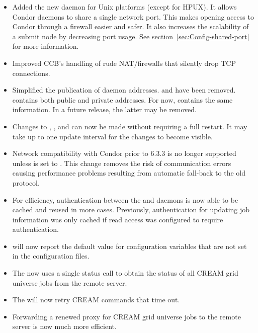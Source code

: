 \begin{itemize}

\item Added the new daemon  for Unix platforms 
  (except for HPUX).
  It allows Condor daemons to share a
  single network port.  This makes opening access to Condor through a
  firewall easier and safer.  It also increases the scalability of a
  submit node by decreasing port usage. See
  section~\ref{sec:Config-shared-port} for more information.

\item Improved CCB's handling of rude NAT/firewalls that silently drop
TCP connections.

\item Simplified the publication of daemon addresses.
   and  have been removed.
   contains both public and private addresses.  For now,
   contains the same information.  In a future release,
  the latter may be removed.

\item Changes to ,
  , and
   can now be made without requiring a
  full restart.  It may take up to one  update interval 
  for the changes to become visible.

\item Network compatibility with Condor prior to 6.3.3 is no longer
  supported unless  is set to
  .  This change removes the risk of communication errors
  causing performance problems resulting from automatic fall-back to the
  old protocol.

\item For efficiency, authentication between the  and
   daemons is now able to be cached and reused in more
  cases.  Previously, authentication for updating job information was
  only cached if read access was configured to require authentication.

\item {} will now report the default value for
  configuration variables that are not set in the configuration files.

\item The  now uses a single status call to obtain
the status of all CREAM grid universe jobs from the remote server.

\item The  will now retry CREAM commands that time out.

\item Forwarding a renewed proxy for CREAM grid universe jobs to the
remote server is now much more efficient.

\end{itemize}

